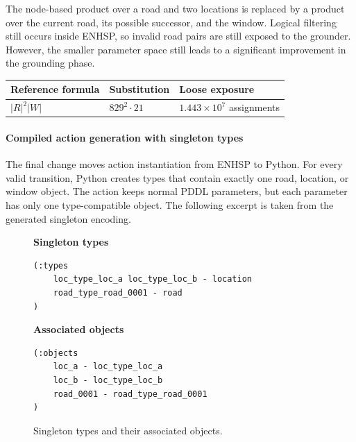 \documentclass[10pt]{article}
\begin{document}
The node-based product over a road and two locations is replaced by a product
over the current road, its possible successor, and the window. Logical
filtering still occurs inside ENHSP, so invalid road pairs are still exposed to
the grounder. However, the smaller parameter space still leads to a significant
improvement in the grounding phase.

\begin{center}
\scriptsize
\begin{tabular}{@{}lll@{}}
\toprule
Reference formula & Substitution & Loose exposure \\
\midrule
$|R|^2|W|$
& $829^2\cdot21$
& $1.443\times10^7$ assignments \\
\bottomrule
\end{tabular}
\end{center}

\paragraph{Compiled action generation with singleton types}
The final change moves action instantiation from ENHSP to Python. For every
valid transition, Python creates types that contain exactly one road, location,
or window object. The action keeps normal PDDL parameters, but each parameter
has only one type-compatible object. The following excerpt is taken from the
generated singleton encoding.

\vspace{0.5em}

\begin{figure}[H]
\centering

\begin{minipage}[t]{0.45\textwidth}
\centering
\textbf{Singleton types}

\begin{lstlisting}
(:types
    loc_type_loc_a loc_type_loc_b - location
    road_type_road_0001 - road
)
\end{lstlisting}

\end{minipage}
\hfill
\begin{minipage}[t]{0.45\textwidth}
\centering
\textbf{Associated objects}

\begin{lstlisting}
(:objects
    loc_a - loc_type_loc_a
    loc_b - loc_type_loc_b
    road_0001 - road_type_road_0001
)
\end{lstlisting}
\end{minipage}

\caption{Singleton types and their associated objects.}
\label{fig:singleton-types}
\end{figure}
\end{document}
